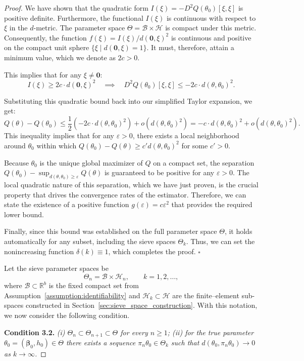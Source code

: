 \documentclass[11pt]{article}
\newcommand{\R}{\mathbb{R}}
\newenvironment{condition}[1]
  {\par\medskip\noindent\textbf{Condition #1.}\itshape}
  {\medskip}
\begin{document}
\begin{proof}
		We have shown that the quadratic form $I(\xi) = -D^2Q(\theta_0)[\xi, \xi]$ is positive definite. Furthermore, the functional $I(\xi)$ is continuous with respect to $\xi$ in the $d$-metric. The parameter space $\Theta = \mathcal{B} \times \mathcal{H}$ is compact under this metric. Consequently, the function $f(\xi) = I(\xi) / d(\bm 0, \xi)^2$ is continuous and positive on the compact unit sphere $\{ \xi \mid d(\bm 0, \xi) = 1 \}$. It must, therefore, attain a minimum value, which we denote as $2c > 0$.
		
		This implies that for any $\xi \neq \bm 0$:
		$$
		I(\xi) \ge 2c \cdot d(\bm 0, \xi)^2 \quad \implies \quad D^2Q(\theta_0)[\xi, \xi] \le -2c \cdot d(\theta, \theta_0)^2.
		$$
		
		Substituting this quadratic bound back into our simplified Taylor expansion, we get:
		$$
		Q(\theta) - Q(\theta_0) \le \frac{1}{2} (-2c \cdot d(\theta, \theta_0)^2) + o(d(\theta, \theta_0)^2) = -c \cdot d(\theta, \theta_0)^2 + o(d(\theta, \theta_0)^2).
		$$
		This inequality implies that for any $\varepsilon > 0$, there exists a local neighborhood around $\theta_0$ within which $Q(\theta_0) - Q(\theta) \ge c' d(\theta, \theta_0)^2$ for some $c'>0$.
		
		Because $\theta_0$ is the unique global maximizer of $Q$ on a compact set, the separation $Q(\theta_0) - \sup_{d(\theta,\theta_0)\ge\varepsilon} Q(\theta)$ is guaranteed to be positive for any $\varepsilon > 0$. The local quadratic nature of this separation, which we have just proven, is the crucial property that drives the convergence rates of the estimator. Therefore, we can state the existence of a positive function $g(\varepsilon) = c \varepsilon^2$ that provides the required lower bound.
		
		Finally, since this bound was established on the full parameter space $\Theta$, it holds automatically for any subset, including the sieve spaces $\Theta_k$. Thus, we can set the nonincreasing function $\delta(k) \equiv 1$, which completes the proof.	 \hfill $\square$
		
		Let the sieve parameter spaces be
		\[
		\Theta_n = \mathcal B \times \mathcal H_n,
		\qquad k = 1,2,\ldots,
		\]
		where $\mathcal B\subset\R^{b}$ is the fixed compact set from
		Assumption~\ref{assumption:identifiability} and
		$\mathcal H_k\subset\mathcal H$ are the finite–element sub-spaces
		constructed in Section~\ref{sec:sieve_space_construction}.
		With this notation, we now consider the following condition. 
        \begin{condition}{3.2} (i) $\Theta_n \subset \Theta_{n+1}\subset\Theta$ for every
			$n\ge 1$; (ii) for the true parameter
			$\theta_0=(\bm \beta_0,h_0)\in\Theta$ there exists a sequence
			$\pi_n\theta_0\in\Theta_k$ such that
			$d(\theta_0,\pi_n\theta_0)\to 0$ as $k\to\infty$.
        \end{condition}


\end{proof}
\end{document}
